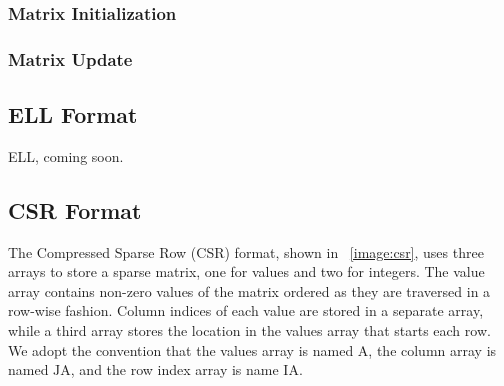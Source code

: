 \documentclass[11pt,conference]{IEEEtran}
\begin{document}
\subsubsection{Matrix Initialization}

\subsubsection{Matrix Update}

\subsection{ELL Format}

ELL, coming soon.

\subsection{CSR Format}

The Compressed Sparse Row (CSR) format, shown in \figurename~\ref{image:csr}, uses three arrays to store a sparse matrix, one for values and two for integers.  The value array contains non-zero values of the matrix ordered as they are traversed in a row-wise fashion.  Column indices of each value are stored in a separate array, while a third array stores the location in the values array that starts each row.  We adopt the convention that the values array is named $\mathrm{A}$, the column array is named $\mathrm{JA}$, and the row index array is name $\mathrm{IA}$.
\end{document}
